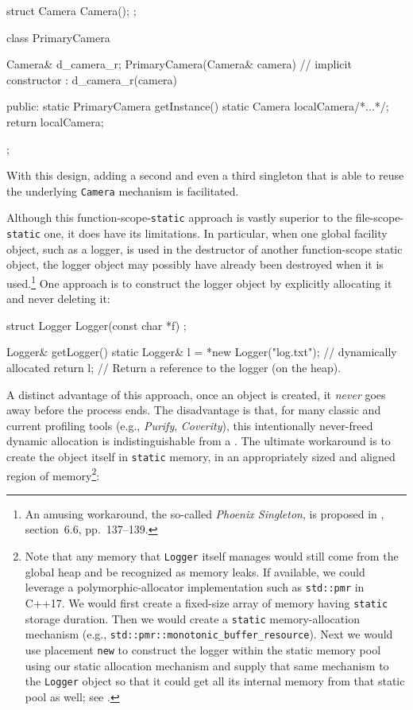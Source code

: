 \begin{emcppshiddenlisting}[emcppsbatch=e11]
struct Camera {
  Camera();
};    
\end{emcppshiddenlisting}
\begin{emcppslisting}[emcppsbatch=e11]
class PrimaryCamera
{
    Camera& d_camera_r;
    PrimaryCamera(Camera& camera)  // implicit constructor
      : d_camera_r(camera) { }  

public:
    static PrimaryCamera getInstance()
    {
        static Camera localCamera{/*...*/};
        return localCamera;
    }
};
\end{emcppslisting}

\noindent With this design, adding a second and even a third singleton that is
able to reuse the underlying \lstinline!Camera! mechanism is facilitated.

Although this function-scope-\lstinline!static! approach is vastly superior
to the file-scope-\lstinline!static! one, it does have its limitations. In
particular, when one global facility object, such as a logger, is used
in the destructor of another function-scope static object, the logger
object may possibly have already been destroyed when it is
used.\footnote{An amusing workaround, the so-called \emph{Phoenix
Singleton}, is proposed in \cite{alexandrescu01}, section~6.6, pp.~137--139.} One approach is to construct the logger object by
explicitly allocating it and never deleting it:

\begin{emcppshiddenlisting}[emcppsbatch={e12,e13,e16,e17}]
struct Logger {
  Logger(const char *f) {}
};
\end{emcppshiddenlisting}
\begin{emcppslisting}[emcppsbatch=e12]
Logger& getLogger()
{
    static Logger& l = *new Logger("log.txt");  // dynamically allocated
    return l;  // Return a reference to the logger (on the heap).
}
\end{emcppslisting}

\noindent A distinct advantage of this approach, once an object is created, it
\emph{never} goes away before the process ends. The disadvantage is
that, for many classic and current profiling tools (e.g., \emph{Purify},
\emph{Coverity}), this intentionally never-freed dynamic allocation is
indistinguishable from a . The ultimate workaround
is to create the object itself in \lstinline!static! memory, in an
appropriately sized and aligned region of memory{\cprotect\footnote{Note
that any memory that \lstinline!Logger! itself manages would still come
from the global heap and be recognized as memory leaks. If available,
we could leverage a polymorphic-allocator implementation such as
\lstinline!std::pmr! in C++17. We would first create a fixed-size array
of memory having \lstinline!static! storage duration. Then we would
create a \lstinline!static! memory-allocation mechanism (e.g.,
\lstinline!std::pmr::monotonic_buffer_resource!). Next we would use
placement \lstinline!new! to construct the logger within the static
memory pool using our static allocation mechanism and supply that same
mechanism to the \lstinline!Logger! object so that it could get all its
  internal memory from that static pool as well; see \cite{lakos22}.}}:

